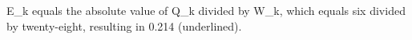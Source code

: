 E_k equals the absolute value of Q_k divided by W_k, which equals six divided by twenty-eight, resulting in 0.214 (underlined).